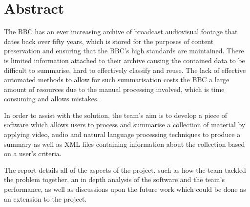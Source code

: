  \section*{Abstract}

The BBC has an ever increasing archive of broadcast audiovisual footage that dates back over fifty years, 
which is stored for the purposes of content preservation and ensuring that the BBC's high standards are maintained. 
There is limited information attached to their archive causing the contained data to be difficult to summarise, hard to effectively classify and 
reuse. The lack of effective automated methods to allow for 
such summarisation costs the BBC a large amount of resources due to the manual processing involved, which is time consuming and allows mistakes.

In order to assist with the solution, the team's aim is to develop a piece of software which allows users to process and summarise a 
collection of material by applying video, audio and natural language processing techniques to produce a summary as well as XML 
files containing information about the collection based on a user’s criteria.

The report details all of the aspects of the project, such as how the team tackled the problem together, an in depth 
analysis of the software and the team's performance, as well as discussions upon the future work which could be done as an extension to the project.

